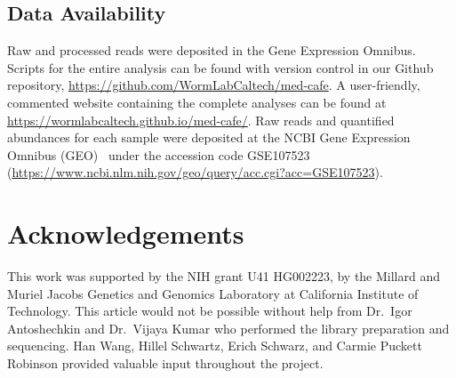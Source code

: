 \documentclass[9pt,twocolumn,twoside]{gsajnl}
\begin{document}
\subsection*{Data Availability}
Raw and processed reads were deposited in the Gene Expression Omnibus. Scripts
for the entire analysis can be found with version control in our Github
repository, \url{https://github.com/WormLabCaltech/med-cafe}. A user-friendly,
commented website containing the complete analyses can be found at
\url{https://wormlabcaltech.github.io/med-cafe/}. Raw reads and quantified
abundances for each sample were deposited at the NCBI Gene Expression Omnibus
(GEO)~\citep{Edgar2002} under the accession code GSE107523
(\url{https://www.ncbi.nlm.nih.gov/geo/query/acc.cgi?acc=GSE107523}).

\section*{Acknowledgements}
This work was supported by the NIH grant U41 HG002223, by the Millard and Muriel
Jacobs Genetics and Genomics Laboratory at California Institute of Technology.
This article would not be possible without help from Dr.\ Igor Antoshechkin and
Dr.\ Vijaya Kumar who performed the library preparation and sequencing. Han
Wang, Hillel Schwartz, Erich Schwarz, and Carmie Puckett Robinson provided
valuable input throughout the project.


% 

\end{document}
